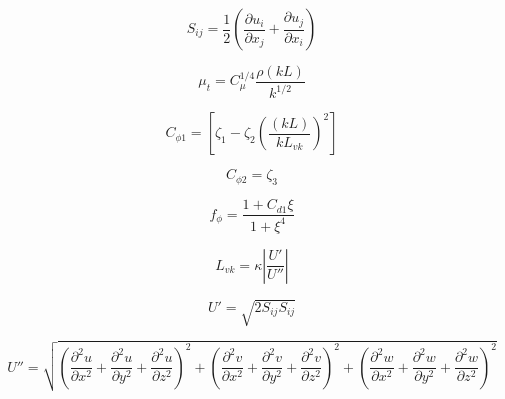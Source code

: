 {\newpage\clearpage
{}%
\begin{displaymath}
S_{ij} = \frac{1}{2} \left( \frac{\partial u_i}{\partial x_j} + \frac{\partial u_j}{\partial x_i} \right)
\end{displaymath}%
\lthtmldisplayZ
\lthtmlcheckvsize\clearpage}

{\newpage\clearpage
{}%
\begin{displaymath}
\mu_t = C_{\mu}^{1/4} \frac{\rho (kL)}{k^{1/2}}
\end{displaymath}%
\lthtmldisplayZ
\lthtmlcheckvsize\clearpage}

{\newpage\clearpage
{}%
\begin{displaymath}
C_{\phi 1} = \left[ \zeta_1 - \zeta_2 \left( \frac{(kL)}{k L_{vk}} \right)^2 \right]
\end{displaymath}%
\lthtmldisplayZ
\lthtmlcheckvsize\clearpage}

{\newpage\clearpage
{}%
\begin{displaymath}
C_{\phi 2} = \zeta_3
\end{displaymath}%
\lthtmldisplayZ
\lthtmlcheckvsize\clearpage}

{\newpage\clearpage
{}%
\begin{displaymath}
f_{\phi} = \frac{1+C_{d1} \xi}{1 + \xi^4}
\end{displaymath}%
\lthtmldisplayZ
\lthtmlcheckvsize\clearpage}

{\newpage\clearpage
{}%
\begin{displaymath}
L_{vk} = \kappa \left| \frac{U'}{U''} \right|
\end{displaymath}%
\lthtmldisplayZ
\lthtmlcheckvsize\clearpage}

{\newpage\clearpage
{}%
\begin{displaymath}
U' = \sqrt{2 S_{ij} S_{ij}}
\end{displaymath}%
\lthtmldisplayZ
\lthtmlcheckvsize\clearpage}

{\newpage\clearpage
{}%
\begin{displaymath}
U'' = \sqrt{
  \left(\frac{\partial^2u}{\partial x^2} + \frac{\partial^2u}{\partial y^2} + \frac{\partial^2u}{\partial z^2} \right)^2 +
  \left(\frac{\partial^2v}{\partial x^2} + \frac{\partial^2v}{\partial y^2} + \frac{\partial^2v}{\partial z^2} \right)^2 +
  \left(\frac{\partial^2w}{\partial x^2} + \frac{\partial^2w}{\partial y^2} + \frac{\partial^2w}{\partial z^2} \right)^2 }
\end{displaymath}%
\lthtmldisplayZ
\lthtmlcheckvsize\clearpage}

